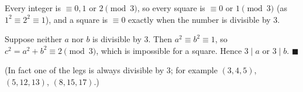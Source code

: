Every integer is $\equiv0,1$ or $2\pmod3$, so every square is $\equiv0$ or $1\pmod3$ (as $1^2\equiv2^2\equiv1$), and a square is $\equiv0$ exactly when the number is divisible by $3$.

Suppose neither $a$ nor $b$ is divisible by $3$. Then $a^2\equiv b^2\equiv1$, so $c^2=a^2+b^2\equiv2\pmod3$, which is impossible for a square. Hence $3\mid a$ or $3\mid b$. $\blacksquare$

(In fact one of the legs is always divisible by $3$; for example $(3,4,5)$, $(5,12,13)$, $(8,15,17)$.)
